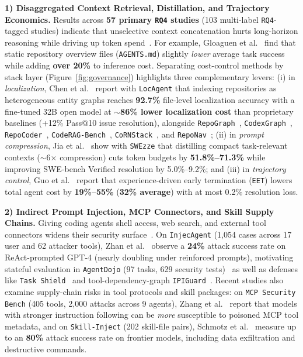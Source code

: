 \documentclass[10pt,twocolumn,a4paper]{article}
\begin{document}
\textbf{1) Disaggregated Context Retrieval, Distillation, and Trajectory Economics.} Results across \textbf{57 primary \texttt{RQ4} studies} (103 multi-label \texttt{RQ4}-tagged studies) indicate that unselective context concatenation hurts long-horizon reasoning while driving up token spend~\cite{liu2024lost,kapoor2024agents}. For example, Gloaguen et al.~\cite{gloaguen2026evaluating} find that static repository overview files (\texttt{AGENTS.md}) slightly \emph{lower} average task success while adding \textbf{over 20\%} to inference cost. Separating cost-control methods by stack layer (Figure~\ref{fig:governance}) highlights three complementary levers: (i) in \emph{localization}, Chen et al.~\cite{chen2025locagent} report with \texttt{LocAgent} that indexing repositories as heterogeneous entity graphs reaches \textbf{92.7\%} file-level localization accuracy with a fine-tuned 32B open model at \textbf{$\sim$86\% lower localization cost} than proprietary baselines (+12\% Pass@10 issue resolution), alongside \texttt{RepoGraph}~\cite{ouyang2025repograph}, \texttt{CodexGraph}~\cite{liu2025codexgraph}, \texttt{RepoCoder}~\cite{zhang2023repocoder}, \texttt{CodeRAG-Bench}~\cite{wang2025coderagbench}, \texttt{CoRNStack}~\cite{suresh2025cornstack}, and \texttt{RepoNav}~\cite{chai2026reponav}; (ii) in \emph{prompt compression}, Jia et al.~\cite{jia2026compressing} show with \texttt{SWEzze} that distilling compact task-relevant contexts ($\sim$6$\times$ compression) cuts token budgets by \textbf{51.8\%--71.3\%} while improving SWE-bench Verified resolution by 5.0\%--9.2\%; and (iii) in \emph{trajectory control}, Guo et al.~\cite{guo2026eet} report that experience-driven early termination (\texttt{EET}) lowers total agent cost by \textbf{19\%--55\%} (\textbf{32\% average}) with at most 0.2\% resolution loss.

\textbf{2) Indirect Prompt Injection, MCP Connectors, and Skill Supply Chains.} Giving coding agents shell access, web search, and external tool connectors widens their security surface~\cite{pearce2023examining,greshake2023not}. On \texttt{InjecAgent} (1,054 cases across 17 user and 62 attacker tools), Zhan et al.~\cite{zhan2024injecagent} observe a \textbf{24\%} attack success rate on ReAct-prompted GPT-4 (nearly doubling under reinforced prompts), motivating stateful evaluation in \texttt{AgentDojo} (97 tasks, 629 security tests)~\cite{andriushchenko2024agentdojo} as well as defenses like \texttt{Task Shield}~\cite{jia2024task} and tool-dependency-graph \texttt{IPIGuard}~\cite{an2025ipiguard}. Recent studies also examine supply-chain risks in tool protocols and skill packages: on \texttt{MCP Security Bench} (405 tools, 2,000 attacks across 9 agents), Zhang et al.~\cite{zhang2025mcp} report that models with stronger instruction following can be \emph{more} susceptible to poisoned MCP tool metadata, and on \texttt{Skill-Inject} (202 skill-file pairs), Schmotz et al.~\cite{schmotz2026skillinject} measure up to an \textbf{80\%} attack success rate on frontier models, including data exfiltration and destructive commands.
\end{document}
